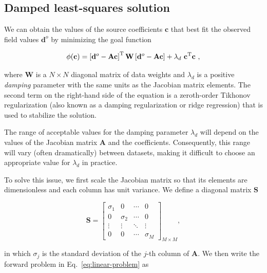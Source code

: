 \subsection{Damped least-squares solution}
\label{sec:eql_inversion}

We can obtain the values of the source coefficients $\mathbf{c}$ that best
fit the observed field values $\mathbf{d}^o$ by minimizing the goal function

\begin{equation}
    \phi(\mathbf{c}) =
    \left[\mathbf{d}^o - \mathbf{A}\mathbf{c}\right]^{\text{T}}
    \mathbf{W}
    \left[\mathbf{d}^o - \mathbf{A}\mathbf{c}\right]
    + \lambda_d\ \mathbf{c}^{\text{T}}\mathbf{c}
    \ ,
    \label{eq:misfit-unscaled}
\end{equation}

\noindent where
$\mathbf{W}$ is a $N \times N$ diagonal matrix of data weights and
$\lambda_d$ is a positive \emph{damping} parameter with the same units as the
Jacobian matrix elements.
The second term on the right-hand side of the equation is a zeroth-order
Tikhonov regularization \citep{tikhonov1977} (also known as a damping
regularization or ridge regression) that is used to stabilize the solution.

The range of acceptable values for the damping parameter $\lambda_d$ will
depend on the values of the Jacobian matrix $\mathbf{A}$ and the coefficients.
Consequently, this range will vary (often dramatically) between datasets,
making it difficult to choose an appropriate value for $\lambda_d$ in practice.

To solve this issue, we first scale the Jacobian matrix so that its elements
are dimensionless and each column has unit variance.
We define a diagonal matrix $\mathbf{S}$

\begin{equation}
    \mathbf{S} =
    \begin{bmatrix}
      \sigma_1 & 0 & \cdots &0 \\
      0 & \sigma_2 & \cdots &0 \\
      \vdots & \vdots & \ddots & \vdots \\
      0  & 0 & \cdots & \sigma_M
    \end{bmatrix}_{M \times M}
    ,
\end{equation}

\noindent in which $\sigma_j$ is the standard deviation of the $j$-th column of
$\mathbf{A}$.
We then write the forward problem in Eq.~\ref{eq:linear-problem} as

